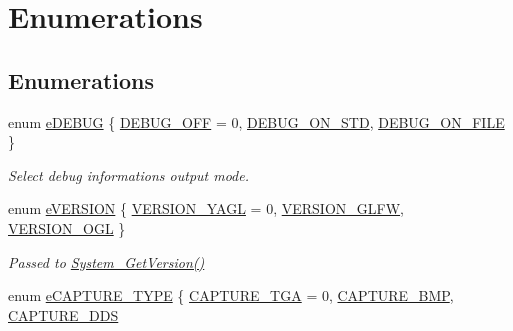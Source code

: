 \hypertarget{group____enums}{\section{Enumerations}
\label{group____enums}
}
\subsection*{Enumerations}
\begin{DoxyCompactItemize}
\item 
enum \hyperlink{group____enums_gaa768cfbfa3bdcb70751d9e3c37b00350}{e\-D\-E\-B\-U\-G} \{ \hyperlink{group____enums_gaa768cfbfa3bdcb70751d9e3c37b00350aae22a84c30c6c631736a86a8c1fff632}{D\-E\-B\-U\-G\-\_\-\-O\-F\-F} = 0, 
\hyperlink{group____enums_gaa768cfbfa3bdcb70751d9e3c37b00350ad0f2feeb16a37b94501eb6ea8a462f88}{D\-E\-B\-U\-G\-\_\-\-O\-N\-\_\-\-S\-T\-D}, 
\hyperlink{group____enums_gaa768cfbfa3bdcb70751d9e3c37b00350a7b2c5a42f8d887321000f1efdca4a94a}{D\-E\-B\-U\-G\-\_\-\-O\-N\-\_\-\-F\-I\-L\-E}
 \}
\begin{DoxyCompactList}\small\item\em Select debug informations output mode. \end{DoxyCompactList}\item 
enum \hyperlink{group____enums_gaf533ba78f210a2fe94fc9fbc85a2b17f}{e\-V\-E\-R\-S\-I\-O\-N} \{ \hyperlink{group____enums_gaf533ba78f210a2fe94fc9fbc85a2b17faaab6e3fae7f011eafec1416b9722cd50}{V\-E\-R\-S\-I\-O\-N\-\_\-\-Y\-A\-G\-L} = 0, 
\hyperlink{group____enums_gaf533ba78f210a2fe94fc9fbc85a2b17fa5106a481796d602924bd952ad53da18f}{V\-E\-R\-S\-I\-O\-N\-\_\-\-G\-L\-F\-W}, 
\hyperlink{group____enums_gaf533ba78f210a2fe94fc9fbc85a2b17fa7ac680bdfd69638579b328d4e992407d}{V\-E\-R\-S\-I\-O\-N\-\_\-\-O\-G\-L}
 \}
\begin{DoxyCompactList}\small\item\em Passed to \hyperlink{group____system_gaa8eeb3a22ed2ad430233fdcc88d7bcc9}{System\-\_\-\-Get\-Version()} \end{DoxyCompactList}\item 
enum \hyperlink{group____enums_ga2f60dfad6de37348e99af1c69a907f7d}{e\-C\-A\-P\-T\-U\-R\-E\-\_\-\-T\-Y\-P\-E} \{ \hyperlink{group____enums_ga2f60dfad6de37348e99af1c69a907f7dabeebf8173bbb6158c7171e9f29817a46}{C\-A\-P\-T\-U\-R\-E\-\_\-\-T\-G\-A} = 0, 
\hyperlink{group____enums_ga2f60dfad6de37348e99af1c69a907f7da9297d37e36b3d91e66c0d63d32bd17b7}{C\-A\-P\-T\-U\-R\-E\-\_\-\-B\-M\-P}, 
\hyperlink{group____enums_ga2f60dfad6de37348e99af1c69a907f7da4a337043f084ac3f65d10fd444c12bdb}{C\-A\-P\-T\-U\-R\-E\-\_\-\-D\-D\-S}

\end{DoxyCompactItemize}
